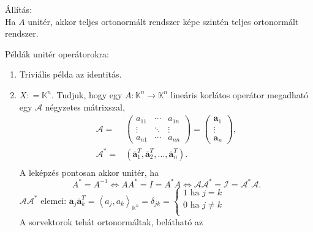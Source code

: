 \documentclass[12pt,a4paper]{scrartcl}
\providecommand{\tightlist}{%
  \setlength{\itemsep}{0pt}\setlength{\parskip}{0pt}}
\newenvironment{allitas}{}{}
\newenvironment{pelda}{}{}
\begin{document}
\begin{allitas}

Állítás:\\
Ha \(A\) unitér, akkor teljes ortonormált rendszer képe szintén teljes
ortonormált rendszer.

\end{allitas}

\begin{pelda}

Példák unitér operátorokra:

\begin{enumerate}
\def\labelenumi{\arabic{enumi}.}
\tightlist
\item
  Triviális példa az identitás.
\item
  \(X: = {\mathbb{K}}^{n}\). Tudjuk, hogy egy
  \(\left. A:{\mathbb{K}}^{n}\rightarrow{\mathbb{K}}^{n} \right.\)
  lineáris korlátos operátor megadható egy \(\mathcal{A}\) négyzetes
  mátrixszal, \[\begin{aligned}
    {\mathcal{A}} =  & \left( {\begin{array}{*{20}{c}}
    {{a_{11}}}& \cdots &{{a_{1n}}} \\ 
     \vdots & \ddots & \vdots  \\ 
    {{a_{n1}}}& \cdots &{{a_{nn}}} 
  \end{array}} \right) = \left( {\begin{array}{*{20}{c}}
    {{{\mathbf{a}}_1}} \\ 
     \vdots  \\ 
    {{{\mathbf{a}}_n}} 
  \end{array}} \right), \\ 
    {{\mathcal{A}}^*} =  & \left( {{\mathbf{\bar a}}_1^T,{\mathbf{\bar a}}_2^T,...,{\mathbf{\bar a}}_n^T} \right). \\ 
  \end{aligned}\] A leképzés pontosan akkor unitér, ha
  \[{A^*} = {A^{ - 1}} \Leftrightarrow A{A^*} = I = {A^*}A \Leftrightarrow \mathcal{A}{\mathcal{A}^*} = \mathcal{I} = {\mathcal{A}^*}\mathcal{A}.\]
  \(\mathcal{A}\mathcal{A}^{*}\) elemei:
  \(\mathbf{a}_{j}\mathbf{\overline{a}}_{k}^{T} = \left\langle {a_{j},a_{k}} \right\rangle_{{\mathbb{K}}^{n}} = \delta_{jk} = \left\{ \begin{array}{l} {1\text{~ha~}j = k} \\ {0\text{~ha~}j \neq k} \\ \end{array} \right.\)\\
  A sorvektorok tehát ortonormáltak, belátható az

\end{enumerate}
\end{pelda}
\end{document}
